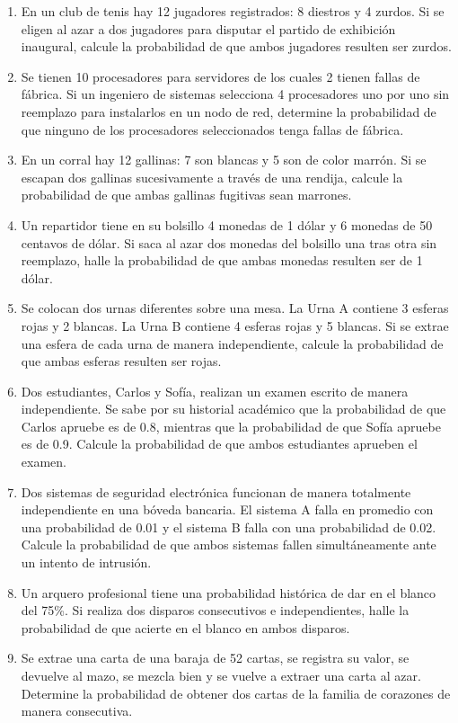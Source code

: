 \documentclass[letterpaper,11pt,spanish]{article}
\begin{document}
\begin{enumerate}
    \item En un club de tenis hay 12 jugadores registrados: 8 diestros y 4 zurdos. Si se eligen al azar a dos jugadores para disputar el partido de exhibición inaugural, calcule la probabilidad de que ambos jugadores resulten ser zurdos.
    
    \item Se tienen 10 procesadores para servidores de los cuales 2 tienen fallas de fábrica. Si un ingeniero de sistemas selecciona 4 procesadores uno por uno sin reemplazo para instalarlos en un nodo de red, determine la probabilidad de que ninguno de los procesadores seleccionados tenga fallas de fábrica.
    
    
    \item En un corral hay 12 gallinas: 7 son blancas y 5 son de color marrón. Si se escapan dos gallinas sucesivamente a través de una rendija, calcule la probabilidad de que ambas gallinas fugitivas sean marrones.
    
    \item Un repartidor tiene en su bolsillo 4 monedas de 1 dólar y 6 monedas de 50 centavos de dólar. Si saca al azar dos monedas del bolsillo una tras otra sin reemplazo, halle la probabilidad de que ambas monedas resulten ser de 1 dólar.
    
    
    \item Se colocan dos urnas diferentes sobre una mesa. La Urna A contiene 3 esferas rojas y 2 blancas. La Urna B contiene 4 esferas rojas y 5 blancas. Si se extrae una esfera de cada urna de manera independiente, calcule la probabilidad de que ambas esferas resulten ser rojas. 
    
    \item Dos estudiantes, Carlos y Sofía, realizan un examen escrito de manera independiente. Se sabe por su historial académico que la probabilidad de que Carlos apruebe es de 0.8, mientras que la probabilidad de que Sofía apruebe es de 0.9. Calcule la probabilidad de que ambos estudiantes aprueben el examen.
    
    
    \item Dos sistemas de seguridad electrónica funcionan de manera totalmente independiente en una bóveda bancaria. El sistema A falla en promedio con una probabilidad de 0.01 y el sistema B falla con una probabilidad de 0.02. Calcule la probabilidad de que ambos sistemas fallen simultáneamente ante un intento de intrusión.
    
    \item Un arquero profesional tiene una probabilidad histórica de dar en el blanco del 75\%. Si realiza dos disparos consecutivos e independientes, halle la probabilidad de que acierte en el blanco en ambos disparos.
    
   
    
    \item Se extrae una carta de una baraja de 52 cartas, se registra su valor, se devuelve al mazo, se mezcla bien y se vuelve a extraer una carta al azar. Determine la probabilidad de obtener dos cartas de la familia de corazones de manera consecutiva.
\end{enumerate}
\end{document}
